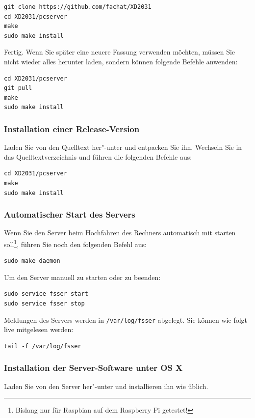 \documentclass[10pt,a4paper]{scrartcl}		%
\begin{document}
\begin{verbatim}
git clone https://github.com/fachat/XD2031
cd XD2031/pcserver
make
sudo make install
\end{verbatim}

Fertig. Wenn Sie später eine neuere Fassung verwenden möchten, müssen Sie
nicht wieder alles herunter laden, sondern können folgende Befehle
anwenden:

\begin{verbatim}
cd XD2031/pcserver
git pull
make
sudo make install
\end{verbatim}

\subsubsection*{Installation einer Release-Version}
Laden Sie von \srcdownloads{}  den Quelltext her"-unter und
entpacken Sie ihn. Wechseln Sie in das Quelltextverzeichnis
und führen die folgenden Befehle aus:

\begin{lstlisting}
cd XD2031/pcserver
make
sudo make install
\end{lstlisting}

\subsubsection*{Automatischer Start des Servers}
Wenn Sie den Server beim Hochfahren des Rechners automatisch mit starten 
soll\footnote{Bislang nur für Raspbian auf dem Raspberry Pi getestet!},
führen Sie noch den folgenden Befehl aus:

\begin{verbatim}
sudo make daemon
\end{verbatim}

Um den Server manuell zu starten oder zu beenden:

\begin{verbatim}
sudo service fsser start
sudo service fsser stop
\end{verbatim}

Meldungen des Servers werden in \texttt{/var/log/fsser} 
abgelegt. Sie können wie folgt live mitgelesen werden:

\begin{verbatim}
tail -f /var/log/fsser
\end{verbatim}

\subsubsection{Installation der Server-Software unter OS X}
Laden Sie von \osxbinaries{} den Server her"-unter und installieren ihn 
wie üblich.
\end{document}
